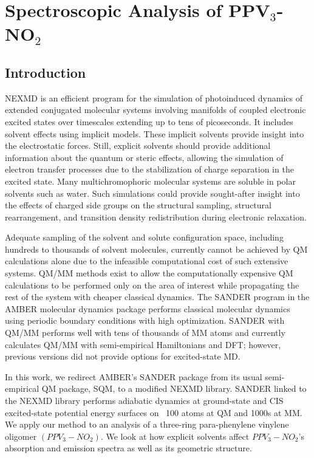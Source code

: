 \chapter{Spectroscopic Analysis of PPV\(_3\)-NO\(_2\)}

\section{Introduction}
NEXMD is an efficient program for the simulation of photoinduced
dynamics of extended conjugated molecular systems involving manifolds
of coupled electronic excited states over timescales extending up to
tens of picoseconds. \cite{sifain2018photoexcited, Bjorgaard2015,
  case2020a, tretiak02_densit_matrix_analy_simul_elect,
  malone2020nexmd} It includes solvent effects using implicit
models. These implicit solvents provide insight into the electrostatic
forces. Still, explicit solvents should provide additional information
about the quantum or steric effects, allowing the simulation of
electron transfer processes due to the stabilization of charge
separation in the excited state.\cite{woo2005solvent}  Many multichromophoric molecular
systems are soluble in polar solvents such as water. Such simulations
could provide sought-after insight into the effects of charged side
groups on the structural sampling, structural rearrangement, and
transition density redistribution during electronic relaxation.

Adequate sampling of the solvent and solute configuration space,
including hundreds to thousands of solvent molecules, currently
cannot be achieved by QM calculations alone due to the infeasible
computational cost of such extensive
systems. \cite{barbatti2011nonadiabatic} QM/MM methods exist to allow
the computationally expensive QM calculations to be performed only on
the area of interest while propagating the rest of the system with
cheaper classical dynamics.  The SANDER program in the AMBER
molecular dynamics package performs classical molecular dynamics
using periodic boundary conditions with high optimization.  SANDER
with QM/MM performs well with tens of thousands of MM atoms and
currently calculates QM/MM with semi-empirical Hamiltonians and DFT;
however, previous versions did not provide options for excited-state
MD.

In this work, we redirect AMBER's SANDER package from its usual
semi-empirical QM package, SQM, to a modified NEXMD library.
SANDER linked to the NEXMD library performs adiabatic dynamics at
ground-state and CIS excited-state potential energy surfaces on
~100 atoms at QM and 1000s at MM.  We apply our method to an
analysis of a three-ring para-phenylene vinylene oligomer
\((PPV_{3}-NO_{2})\).  We look at how explicit solvents affect \(PPV_{3}-NO_{2}\)'s
absorption and emission spectra as well as its geometric structure.

